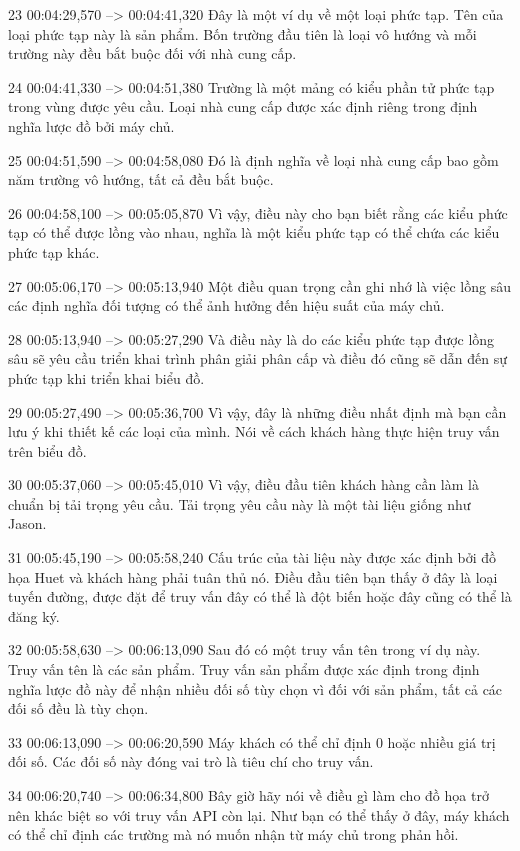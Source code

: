 23
00:04:29,570 --> 00:04:41,320
Đây là một ví dụ về một loại phức tạp.  Tên của loại phức tạp này là sản phẩm.  Bốn trường đầu tiên là loại vô hướng và mỗi trường này đều bắt buộc đối với nhà cung cấp.

24
00:04:41,330 --> 00:04:51,380
Trường là một mảng có kiểu phần tử phức tạp trong vùng được yêu cầu.  Loại nhà cung cấp được xác định riêng trong định nghĩa lược đồ bởi máy chủ.

25
00:04:51,590 --> 00:04:58,080
Đó là định nghĩa về loại nhà cung cấp bao gồm năm trường vô hướng, tất cả đều bắt buộc.

26
00:04:58,100 --> 00:05:05,870
Vì vậy, điều này cho bạn biết rằng các kiểu phức tạp có thể được lồng vào nhau, nghĩa là một kiểu phức tạp có thể chứa các kiểu phức tạp khác.

27
00:05:06,170 --> 00:05:13,940
Một điều quan trọng cần ghi nhớ là việc lồng sâu các định nghĩa đối tượng có thể ảnh hưởng đến hiệu suất của máy chủ.

28
00:05:13,940 --> 00:05:27,290
Và điều này là do các kiểu phức tạp được lồng sâu sẽ yêu cầu triển khai trình phân giải phân cấp và điều đó cũng sẽ dẫn đến sự phức tạp khi triển khai biểu đồ.

29
00:05:27,490 --> 00:05:36,700
Vì vậy, đây là những điều nhất định mà bạn cần lưu ý khi thiết kế các loại của mình.  Nói về cách khách hàng thực hiện truy vấn trên biểu đồ.

30
00:05:37,060 --> 00:05:45,010
Vì vậy, điều đầu tiên khách hàng cần làm là chuẩn bị tải trọng yêu cầu.  Tải trọng yêu cầu này là một tài liệu giống như Jason.

31
00:05:45,190 --> 00:05:58,240
Cấu trúc của tài liệu này được xác định bởi đồ họa Huet và khách hàng phải tuân thủ nó.  Điều đầu tiên bạn thấy ở đây là loại tuyến đường, được đặt để truy vấn đây có thể là đột biến hoặc đây cũng có thể là đăng ký.

32
00:05:58,630 --> 00:06:13,090
Sau đó có một truy vấn tên trong ví dụ này.  Truy vấn tên là các sản phẩm.  Truy vấn sản phẩm được xác định trong định nghĩa lược đồ này để nhận nhiều đối số tùy chọn vì đối với sản phẩm, tất cả các đối số đều là tùy chọn.

33
00:06:13,090 --> 00:06:20,590
Máy khách có thể chỉ định 0 hoặc nhiều giá trị đối số.  Các đối số này đóng vai trò là tiêu chí cho truy vấn.

34
00:06:20,740 --> 00:06:34,800
Bây giờ hãy nói về điều gì làm cho đồ họa trở nên khác biệt so với truy vấn API còn lại.  Như bạn có thể thấy ở đây, máy khách có thể chỉ định các trường mà nó muốn nhận từ máy chủ trong phản hồi.

